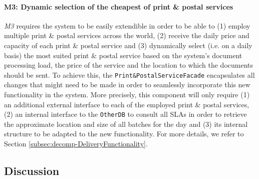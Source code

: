 \documentclass[a4paper,10pt]{article}
\begin{document}
\paragraph{M3: Dynamic selection of the cheapest of print \& postal services}
\textit{M3} requires the system to be easily extendible in order to be able to (1) employ multiple print \& postal services across the world, (2) receive the daily price and capacity of each print \& postal service and (3) dynamically select (i.e. on a daily basis) the most suited print \& postal service based on the system's document processing load, the price of the service and the location to which the documents should be sent. To achieve this, the \texttt{Print\&PostalServiceFacade} encapsulates all changes that might need to be made in order to seamlessly incorporate this new functionality in the system. More precisely, this component will only require (1) an additional external interface to each of the employed print \& postal services, (2) an internal interface to the \texttt{OtherDB} to consult all SLAs in order to retrieve the approximate location and size of all batches for the day and (3) its internal structure to be adapted to the new functionality.
For more details, we refer to Section \ref{subsec:decomp-DeliveryFunctionality}.

\subsection{Discussion}
\end{document}
